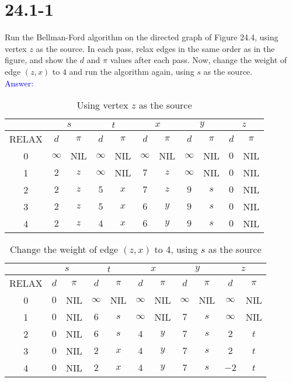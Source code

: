 \documentclass[a4paper]{article}
\begin{document}
\section{24.1-1} Run the Bellman-Ford algorithm on the directed graph of Figure 24.4, using vertex $z$ as the source. In each pass, relax edges in the same order as in the figure, and show the $d$ and $\pi$ values after each pass. Now, change the weight of edge $(z, x)$ to $4$ and run the algorithm again, using $s$ as the source.\\
\textcolor{blue}{Answer:}
    \begin{table}[h]
        \centering
        \begin{tabular}{c||cc|cc|cc|cc|cc}
          & \multicolumn{2}{c|}{$s$} & \multicolumn{2}{c|}{$t$} & \multicolumn{2}{c|}{$x$} & \multicolumn{2}{c|}{$y$} & \multicolumn{2}{c}{$z$} \\
          \hline
          RELAX & $d$ & $\pi$ & $d$ & $\pi$ & $d$ & $\pi$ & $d$ & $\pi$ & $d$ & $\pi$ \\
          \hline\hline
          0 & $\infty$ & NIL & $\infty$ & NIL & $\infty$ & NIL & $\infty$ & NIL & $0$ & NIL \\
          1 & $2     $ & $z$ & $\infty$ & NIL & $7     $ & $z$ & $\infty$ & NIL & $0$ & NIL \\
          2 & $2     $ & $z$ & $5     $ & $x$ & $7     $ & $z$ & $9     $ & $s$ & $0$ & NIL \\
          3 & $2     $ & $z$ & $5     $ & $x$ & $6     $ & $y$ & $9     $ & $s$ & $0$ & NIL \\
          4 & $2     $ & $z$ & $4     $ & $x$ & $6     $ & $y$ & $9     $ & $s$ & $0$ & NIL
        \end{tabular}
        \caption{Using vertex $z$ as the source}
        \label{tab:my_label1}
    \end{table}
    \begin{table}[h]
        \centering
        \begin{tabular}{c||cc|cc|cc|cc|cc}
          & \multicolumn{2}{c|}{$s$} & \multicolumn{2}{c|}{$t$} & \multicolumn{2}{c|}{$x$} & \multicolumn{2}{c|}{$y$} & \multicolumn{2}{c}{$z$} \\
          \hline
          RELAX & $d$ & $\pi$ & $d$ & $\pi$ & $d$ & $\pi$ & $d$ & $\pi$ & $d$ & $\pi$ \\
          \hline\hline
          0 & $0     $ & NIL & $\infty$ & NIL & $\infty$ & NIL & $\infty$ & NIL & $\infty$ & NIL \\
          1 & $0     $ & NIL & $6     $ & $s$ & $\infty$ & NIL & $7     $ & $s$ & $\infty$ & NIL \\
          2 & $0     $ & NIL & $6     $ & $s$ & $4     $ & $y$ & $7     $ & $s$ & $2     $ & $t$ \\
          3 & $0     $ & NIL & $2     $ & $x$ & $4     $ & $y$ & $7     $ & $s$ & $2     $ & $t$ \\
          4 & $0     $ & NIL & $2     $ & $x$ & $4     $ & $y$ & $7     $ & $s$ & $-2    $ & $t$
        \end{tabular}
        \caption{Change the weight of edge $(z,x)$ to 4, using $s$ as the source}
        \label{tab:my_label2}
    \end{table}\\
\end{document}
